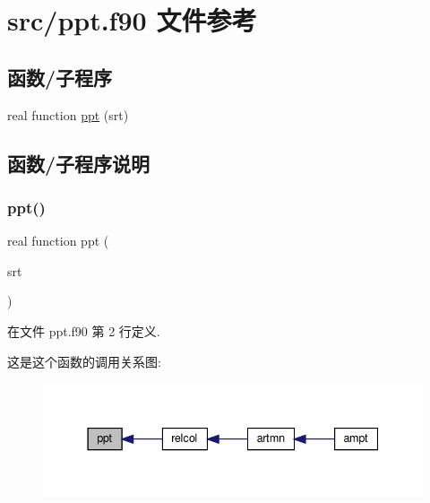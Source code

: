 \hypertarget{ppt_8f90}{}\section{src/ppt.f90 文件参考}
\label{ppt_8f90}
\subsection*{函数/子程序}
\begin{DoxyCompactItemize}
\item 
real function \mbox{\hyperlink{ppt_8f90_a02639a32238d3daae649469e5c77bac9}{ppt}} (srt)
\end{DoxyCompactItemize}


\subsection{函数/子程序说明}
\mbox{\label{ppt_8f90_a02639a32238d3daae649469e5c77bac9}} 
\subsubsection{\texorpdfstring{ppt()}{ppt()}}
{\footnotesize\ttfamily real function ppt (\begin{DoxyParamCaption}\item[{}]{srt }\end{DoxyParamCaption})}



在文件 ppt.\+f90 第 2 行定义.

这是这个函数的调用关系图\+:
\nopagebreak
\begin{figure}[H]
\begin{center}
\leavevmode
\includegraphics[width=337pt]{ppt_8f90_a02639a32238d3daae649469e5c77bac9_icgraph}
\end{center}
\end{figure}
